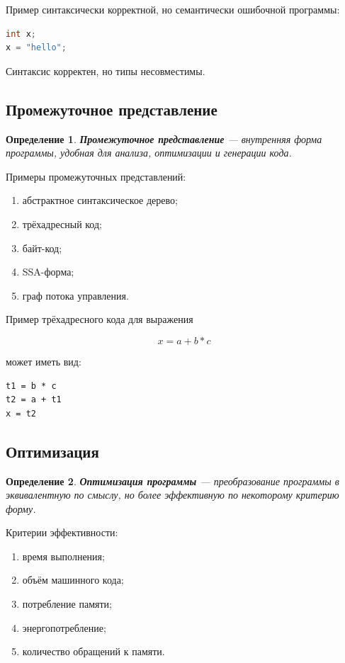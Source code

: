 \documentclass[12pt,a4paper]{article}
\newtheorem{definition}{Определение}
\begin{document}
Пример синтаксически корректной, но семантически ошибочной программы:

\begin{lstlisting}[language=C]
int x;
x = "hello";
\end{lstlisting}

Синтаксис корректен, но типы несовместимы.

\subsection{Промежуточное представление}

\begin{definition}
\textbf{Промежуточное представление} --- внутренняя форма программы, удобная для анализа, оптимизации и генерации кода.
\end{definition}

Примеры промежуточных представлений:
\begin{enumerate}
  \item абстрактное синтаксическое дерево;
  \item трёхадресный код;
  \item байт-код;
  \item SSA-форма;
  \item граф потока управления.
\end{enumerate}

Пример трёхадресного кода для выражения

\[
x = a + b * c
\]

может иметь вид:

\begin{lstlisting}
t1 = b * c
t2 = a + t1
x = t2
\end{lstlisting}

\subsection{Оптимизация}

\begin{definition}
\textbf{Оптимизация программы} --- преобразование программы в эквивалентную по смыслу, но более эффективную по некоторому критерию форму.
\end{definition}

Критерии эффективности:
\begin{enumerate}
  \item время выполнения;
  \item объём машинного кода;
  \item потребление памяти;
  \item энергопотребление;
  \item количество обращений к памяти.
\end{enumerate}
\end{document}
